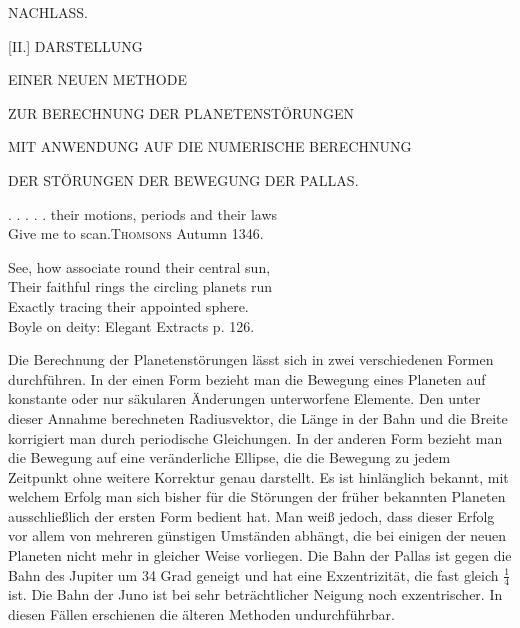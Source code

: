 \clearpage
{}
\begin{center}
{\Large NACHLASS.\par}
\bigskip
{\large [II.] DARSTELLUNG\par}
{\large EINER NEUEN METHODE\par}
ZUR BERECHNUNG DER PLANETENSTÖRUNGEN\par
MIT ANWENDUNG AUF DIE NUMERISCHE BERECHNUNG\par
DER STÖRUNGEN DER BEWEGUNG DER PALLAS.
\end{center}
\begin{flushright}
\begin{minipage}{.94\textwidth}
\small\raggedright
. . . . . their motions, periods and their laws\\
Give me to scan.\quad \textsc{Thomsons} Autumn 1346.
\par\medskip
See, how associate round their central sun,\\
Their faithful rings the circling planets run\\
Exactly tracing their appointed sphere.\\
\hspace*{1em}Boyle on deity: Elegant Extracts p. 126.
\end{minipage}
\end{flushright}
\noindent\hspace*{\parindent}Die Berechnung der Planetenstörungen lässt sich in zwei verschiedenen Formen durchführen. In der einen Form bezieht man die Bewegung eines Planeten auf konstante oder nur säkularen Änderungen unterworfene Elemente. Den unter dieser Annahme berechneten Radiusvektor, die Länge in der Bahn und die Breite korrigiert man durch periodische Gleichungen. In der anderen Form bezieht man die Bewegung auf eine veränderliche Ellipse, die die Bewegung zu jedem Zeitpunkt ohne weitere Korrektur genau darstellt. Es ist hinlänglich bekannt, mit welchem Erfolg man sich bisher für die Störungen der früher bekannten Planeten ausschließlich der ersten Form bedient hat. Man weiß jedoch, dass dieser Erfolg vor allem von mehreren günstigen Umständen abhängt, die bei einigen der neuen Planeten nicht mehr in gleicher Weise vorliegen. Die Bahn der Pallas ist gegen die Bahn des Jupiter um 34 Grad geneigt und hat eine Exzentrizität, die fast gleich \(\frac{1}{4}\) ist. Die Bahn der Juno ist bei sehr beträchtlicher Neigung noch exzentrischer. In diesen Fällen erschienen die älteren Methoden undurchführbar.
